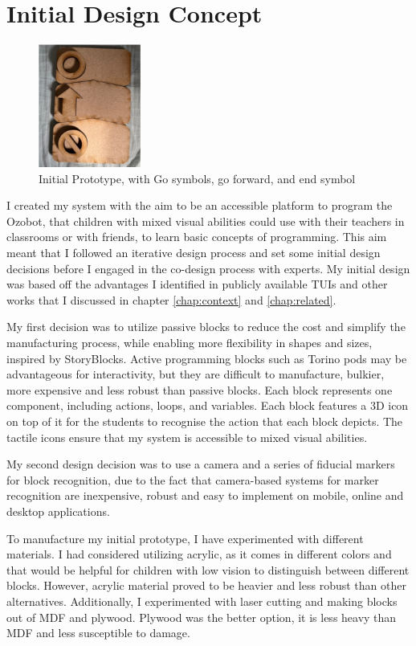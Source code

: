\documentclass[oneside,%
                    author={Malak Hajji},
                    degree={BSc},
                    title={Designing An Accessible Ozobot Programming Platform for Students},
                  subtitle={With Mixed Visual Abilities}]{dissertation}
\begin{document}
\section{Initial Design Concept}
\begin{figure}
    \centering
    \includegraphics[width=0.3\textwidth]{thesis/initial-block.eps}
    \caption{Initial Prototype, with Go symbols, go forward, and end symbol}
    \label{fig-initial}
\end{figure}
I created my system with the aim to be an accessible platform to program the Ozobot, that children with mixed visual abilities could use with their teachers in classrooms or with friends, to learn basic concepts of programming. This aim meant that I followed an iterative design process and set some initial design decisions before I engaged in the co-design process with experts. My initial design was based off the advantages I identified in publicly available TUIs and other works that I discussed in chapter \ref{chap:context} and \ref{chap:related}.

My first decision was to utilize passive blocks to reduce the cost and simplify the manufacturing process, while enabling more flexibility in shapes and sizes, inspired by StoryBlocks\cite{storyblocks}. Active programming blocks such as Torino pods may be advantageous for interactivity, but they are difficult to manufacture, bulkier, more expensive and less robust than passive blocks\cite{torino}.  Each block represents one component, including actions, loops, and variables. Each block features a 3D icon on top of it for the students to recognise the action that each block depicts. The tactile icons ensure that my system is accessible to mixed visual abilities.

My second design decision was to use a camera and a series of fiducial markers for block recognition, due to the fact that camera-based systems for marker recognition are inexpensive, robust and easy to implement on mobile, online and desktop applications.

To manufacture my initial prototype, I have experimented with different materials. I had considered utilizing acrylic, as it comes in different colors and that would be helpful for children with low vision to distinguish between different blocks. However, acrylic material proved to be heavier and less robust than other alternatives. Additionally, I experimented with laser cutting and making blocks out of MDF and plywood. Plywood was the better option, it is less heavy than MDF and less susceptible to damage. 
\end{document}

